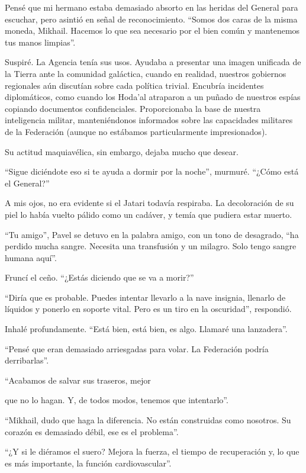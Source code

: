 \documentclass[spanish,12pt,a4paper,oneside,titlepage]{book}
\begin{document}
    Pensé que mi hermano estaba demasiado absorto en las heridas del General para escuchar, pero asintió en señal de reconocimiento. ``Somos dos caras de la misma moneda, Mikhail. Hacemos lo que sea necesario por el bien común y mantenemos tus manos limpias''.

    Suspiré. La Agencia tenía sus usos. Ayudaba a presentar una imagen unificada de la Tierra ante la comunidad galáctica, cuando en realidad, nuestros gobiernos regionales aún discutían sobre cada política trivial. Encubría incidentes diplomáticos, como cuando los Hoda'al atraparon a un puñado de nuestros espías copiando documentos confidenciales. Proporcionaba la base de nuestra inteligencia militar, manteniéndonos informados sobre las capacidades militares de la Federación (aunque no estábamos particularmente impresionados).

    Su actitud maquiavélica, sin embargo, dejaba mucho que desear.

    ``Sigue diciéndote eso si te ayuda a dormir por la noche'', murmuré. ``¿Cómo está el General?''

    A mis ojos, no era evidente si el Jatari todavía respiraba. La decoloración de su piel lo había vuelto pálido como un cadáver, y temía que pudiera estar muerto.

    ``Tu amigo'', Pavel se detuvo en la palabra amigo, con un tono de desagrado, ``ha perdido mucha sangre. Necesita una transfusión y un milagro. Solo tengo sangre humana aquí''.

    Fruncí el ceño. ``¿Estás diciendo que se va a morir?''

    ``Diría que es probable. Puedes intentar llevarlo a la nave insignia, llenarlo de líquidos y ponerlo en soporte vital. Pero es un tiro en la oscuridad'', respondió.

    Inhalé profundamente. ``Está bien, está bien, es algo. Llamaré una lanzadera''.

    ``Pensé que eran demasiado arriesgadas para volar. La Federación podría derribarlas''.

    ``Acabamos de salvar sus traseros, mejor

    que no lo hagan. Y, de todos modos, tenemos que intentarlo''.

    ``Mikhail, dudo que haga la diferencia. No están construidas como nosotros. Su corazón es demasiado débil, ese es el problema''.

    ``¿Y si le diéramos el suero? Mejora la fuerza, el tiempo de recuperación y, lo que es más importante, la función cardiovascular''.
\end{document}
